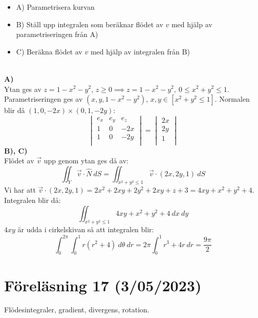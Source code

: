 \documentclass{report}
\begin{document}
{\begin{itemize}
	\item A) Parametrisera kurvan
	\item B) Ställ upp integralen som beräknar flödet av $ v $ med hjälp av parametriseringen från A)
	\item C) Beräkna flödet av $ v $ med hjälp av integralen från B)
\end{itemize}
\dotfill\\
\textbf{A)}\\
Ytan ges av $ z = 1-x^2-y^2 $, $ z \ge 0  \implies z = 1-x^2-y^2, \: 0 \le x^2+y^2 \le 1 $. Parametriseringen ges av $ (x,y, 1-x^2-y^2) $, $ x,y \in [ x^2+y^2 \le 1 ] $. Normalen blir då $ (1,0,-2x) \times (0,1,-2y) $:
\begin{equation*}
\begin{vmatrix}
	e_x & e_y & e_z \\
	1 & 0 & -2x \\
	1 & 0 & -2y \\
\end{vmatrix}
=
\begin{vmatrix}
	2x \\
	2y \\
	1 \\
\end{vmatrix}
\end{equation*}
	\textbf{B), C)}\\
Flödet av $ \vec{v}  $ upp genom ytan ges då av:
\begin{equation*}
	\iint_{Y}^{} \vec{v} \cdot \hat{N} \: dS = \iint_{x^2+y^2 \le 1}^{} \vec{v} \cdot (2x,2y,1) \: dS  
\end{equation*}
Vi har att $ \vec{v} \cdot (2x,2y,1) = 2x^2+2xy+2y^2+2xy+z+3 = 4xy+x^2+y^2+4 $. Integralen blir då:
\begin{equation*}
\iint_{x^2+y^2 \le 1}^{} 4xy+x^2+y^2+4 \: dx   \: dy
\end{equation*}
$ 4xy $ är udda i cirkelskivan så att integralen blir:
\begin{equation*}
\int_{0}^{2\pi} \int_{0}^{1} r(r^2+4) \: d\theta  \: dr = 2\pi \int_{0}^{1} r^3+4r \: dr = \frac{9\pi}{2}   
\end{equation*}
}

\pagebreak
\section{Föreläsning 17 (3/05/2023)}
Flödesintegraler, gradient, divergens, rotation.\\\\
\end{document}
